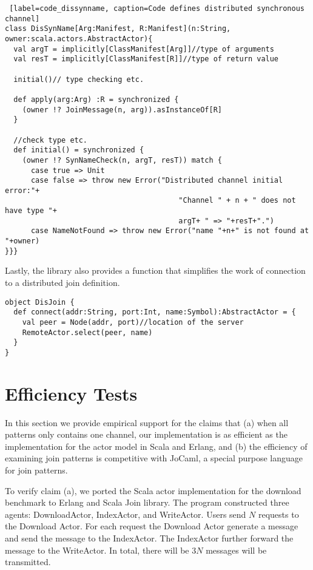 \begin{lstlisting} [label=code_dissynname, caption=Code defines distributed synchronous channel]
class DisSynName[Arg:Manifest, R:Manifest](n:String, owner:scala.actors.AbstractActor){
  val argT = implicitly[ClassManifest[Arg]]//type of arguments
  val resT = implicitly[ClassManifest[R]]//type of return value
  
  initial()// type checking etc.
  
  def apply(arg:Arg) :R = synchronized {
    (owner !? JoinMessage(n, arg)).asInstanceOf[R]
  }
  
  //check type etc.
  def initial() = synchronized {
    (owner !? SynNameCheck(n, argT, resT)) match {
      case true => Unit
      case false => throw new Error("Distributed channel initial error:"+
                                        "Channel " + n + " does not have type "+
                                        argT+ " => "+resT+".")
      case NameNotFound => throw new Error("name "+n+" is not found at "+owner)
}}}
\end{lstlisting}

Lastly, the library also provides a function that simplifies the work of connection to a distributed join definition.

\begin{lstlisting}
object DisJoin {
  def connect(addr:String, port:Int, name:Symbol):AbstractActor = {
    val peer = Node(addr, port)//location of the server
    RemoteActor.select(peer, name)
  }
}
\end{lstlisting}

\section{Efficiency Tests}
\label{efficiency}

In this section we provide empirical support for the claims that (a) when all patterns only contains one channel, our implementation is as efficient as the implementation for the actor model in Scala and Erlang, and (b) the efficiency of examining join patterns is competitive with JoCaml, a special purpose language for join patterns.

To verify claim (a), we ported the Scala  actor implementation for the download benchmark  \cite{DownloadBench} to Erlang and Scala Join library.  The program constructed three agents: DownloadActor, IndexActor, and WriteActor.  Users send $N$ requests to the Download Actor.  For each request the Download Actor generate a message and send the message to the IndexActor.  The IndexActor further forward the message to the WriteActor.  In total, there will be $3N$ messages will be transmitted.

